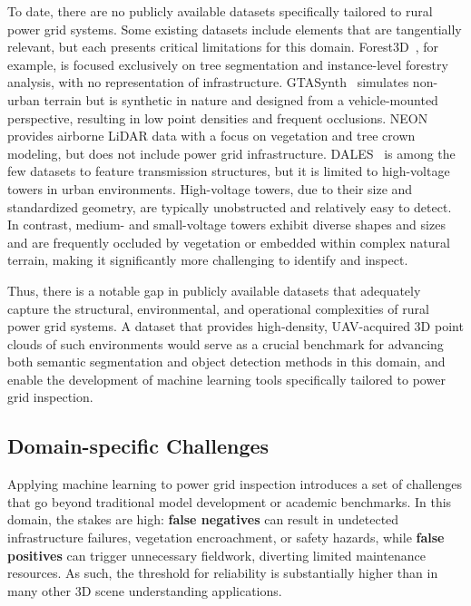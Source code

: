 To date, there are no publicly available datasets specifically tailored to
rural power grid systems. Some existing datasets include elements that are
tangentially relevant, but each presents critical limitations for this domain.
Forest3D~\cite{trochta20173d}, for example, is focused exclusively on tree
segmentation and instance-level forestry analysis, with no representation of
infrastructure. GTASynth~\cite{curnis2022gtasynth} simulates non-urban terrain
but is synthetic in nature and designed from a vehicle-mounted perspective,
resulting in low point densities and frequent occlusions.
NEON~\cite{marconi2019data} provides airborne LiDAR data with a focus on
vegetation and tree crown modeling, but does not include power grid
infrastructure.
%
DALES~\cite{varney2020dales} is among the few datasets to feature transmission
structures, but it is limited to high-voltage towers in urban environments.
High-voltage towers, due to their size and standardized geometry, are typically
unobstructed and relatively easy to detect. In contrast, medium- and
small-voltage towers exhibit diverse shapes and sizes and are frequently
occluded by vegetation or embedded within complex natural terrain, making it
significantly more challenging to identify and inspect.
%

Thus, there is a notable gap in publicly available datasets that adequately
capture the structural, environmental, and operational complexities of rural
power grid systems. A dataset that provides high-density, UAV-acquired 3D point
clouds of such environments would serve as a crucial benchmark for advancing
both semantic segmentation and object detection methods in this domain, and
enable the development of machine learning tools specifically tailored to power
grid inspection.

\subsection{Domain-specific Challenges}

Applying machine learning to power grid inspection introduces a set of
challenges that go beyond traditional model development or academic benchmarks.
In this domain, the stakes are high: \textbf{false negatives} can result in
undetected infrastructure failures, vegetation encroachment, or safety hazards,
while \textbf{false positives} can trigger unnecessary fieldwork, diverting
limited maintenance resources. As such, the threshold for reliability is
substantially higher than in many other 3D scene understanding applications.

